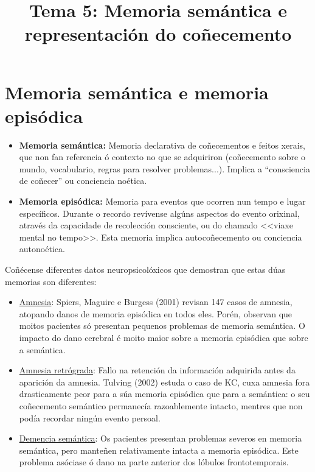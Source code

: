 \documentclass[a4paper,11pt]{article}
\title{Tema 5: Memoria semántica e representación do coñecemento}
\date{} %
\begin{document}
  

\maketitle 

\section{Memoria semántica e memoria episódica}
\begin{itemize}
	\item \textbf{Memoria semántica:} Memoria declarativa de coñecementos e feitos xerais, que non 
	fan referencia ó contexto no que se adquiriron (coñecemento sobre o mundo, vocabulario, regras 
	para resolver problemas...). Implica a ``consciencia de coñecer'' ou conciencia noética.
	\item \textbf{Memoria episódica:} Memoria para eventos que ocorren nun tempo e lugar 
	específicos. Durante o recordo revívense algúns aspectos do evento orixinal, através da 
	capacidade de recolección consciente, ou do chamado <<viaxe mental no tempo>>. Esta memoria 
	implica autocoñecemento ou conciencia autonoética.
\end{itemize}

Coñécense diferentes datos neuropsicolóxicos que demostran que estas dúas memorias son diferentes:
\begin{itemize}
	\item \underline{Amnesia}: Spiers, Maguire e Burgess (2001) revisan 147 casos de amnesia, 
	atopando danos de memoria episódica en todos eles. Porén, observan que moitos pacientes só 
	presentan pequenos problemas de memoria semántica. O impacto do dano cerebral é moito maior 
	sobre a memoria episódica que sobre a semántica.
	\item \underline{Amnesia retrógrada}: Fallo na retención da información adquirida antes da 
	aparición da amnesia. Tulving (2002) estuda o caso de KC, cuxa amnesia fora drasticamente peor 
	para a súa memoria episódica que para a semántica: o seu coñecemento semántico permanecía 
	razoablemente intacto, mentres que non podía recordar ningún evento persoal.
	\item \underline{Demencia semántica}: Os pacientes presentan problemas severos en memoria 
	semántica, pero manteñen relativamente intacta a memoria episódica. Este problema asóciase ó 
	dano na parte anterior dos lóbulos frontotemporais.
\end{itemize}
\end{document}
